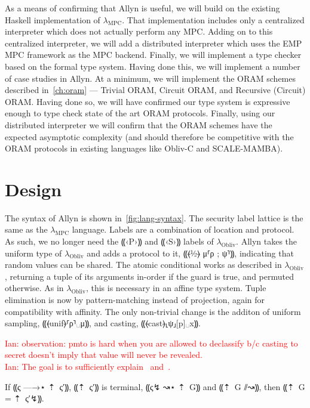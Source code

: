 \documentclass{report}
\newcommand{\lang}{Allyn\xspace}
\newcommand{\mpc}{\ensuremath{\lambda_{\mathrm{MPC}}}\xspace}
\newcommand{\obliv}{\ensuremath{\lambda_{\mathrm{Obliv}}}\xspace}
\newcommand{\ins}[1]{\textcolor{red}{Ian: #1}}
\begin{document}
As a means of confirming that \lang is useful, we will build on the existing Haskell implementation of \mpc. That implementation
includes only a centralized interpreter which does not actually perform any MPC. Adding on to this centralized interpreter, we will
add a distributed interpreter which uses the EMP MPC framework as the MPC backend. Finally, we will implement a type checker based
on the formal type system. Having done this, we will implement a number of case studies in \lang. At a minimum, we will implement
the ORAM schemes described in~\cref{ch:oram} --- Trivial ORAM, Circuit ORAM, and Recursive (Circuit) ORAM. Having done so, we will
have confirmed our type system is expressive enough to type check state of the art ORAM protocols. Finally, using our distributed
interpreter we will confirm that the ORAM schemes have the expected asymptotic complexity (and should therefore be competitive with
the ORAM protocols in existing languages like Obliv-C and SCALE-MAMBA).

\section{Design}

The syntax of \lang is shown in~\cref{fig:lang-syntax}. The security label lattice is the same as
the \mpc language. Labels are a combination of location and protocol. As such, we no longer need the ⸨‹P›⸩ and ⸨‹S›⸩ labels
of \obliv. \lang takes the uniform type of \obliv and adds a protocol to it, ⸨⦑½⦒ μ⸢ρ ; ψ⸣⸩, indicating that random values
can be shared. The atomic conditional works as described in \obliv, returning a tuple of its arguments in-order if the guard
is true, and permuted otherwise. As in \obliv, this is necessary in an affine type system. Tuple elimination is now by
pattern-matching instead of projection, again for compatibility with affinity. The only non-trivial change is the additon of
uniform sampling, ⸨⦑unif⦒⸢ρ⸣␣μ⸩, and casting, ⸨⦑cast⦒⸤ψ⸥[p]␣x⸩.

\ins{observation: pmto is hard when you are allowed to declassify b/c casting to secret doesn't imply that value will never be revealed.} \\

\ins{The goal is to sufficiently explain~\nameref{thm:lang-simulation} and~\nameref{thm:lang-pmto}.}

\begin{theorem} \label{thm:lang-simulation}
  If ⸨ς —→⋆ ⇡~{ς′}⸩, ⸨⇡~{ς′}⸩ is terminal, ⸨ς↯ ↝⋆ ⇡~{G}⸩ and ⸨⇡~{G} ⫽↝⸩, then ⸨⇡~{G} = ⇡~{ς′}↯⸩.
\end{theorem}
\end{document}
